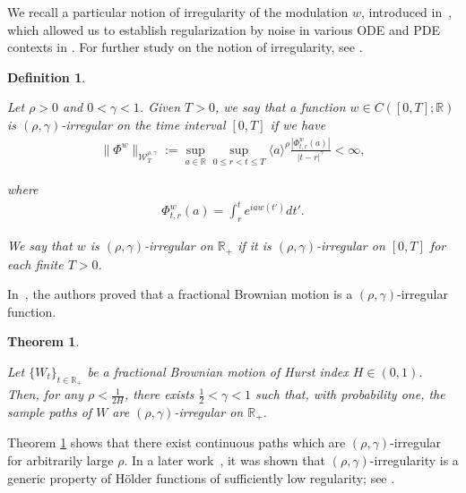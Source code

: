 \documentclass[letterpaper, 11pt,  reqno]{amsart}
\newtheorem{definition}[theorem]{Definition}
\newtheorem{oldtheorem}{Theorem}
\newcommand{\1}{\hspace{0.5mm}\text{I}\hspace{0.5mm}}
\newcommand{\noi}{\noindent}
\newcommand{\R}{\mathbb{R}}
\newcommand{\g}{\gamma}
\newcommand{\W}{\mathcal{W}}
\numberwithin{equation}{section}
\numberwithin{theorem}{section}
\begin{document}
We recall a particular notion of irregularity of the modulation $w$, 
introduced in~\cite{CatellierGubinelli, CG1},
which allowed us 
 to establish regularization by noise  in various  ODE and PDE contexts
in \cite{CatellierGubinelli,CG1, CGLLO1, CGLLO2}.
For further study on the notion of irregularity, 
see  \cite{GG, RT}.



\begin{definition}
\label{DEF:ir}
\rm

Let $\rho>0$ and  $0 < \g < 1$.
Given $T > 0$, we say that a function $w\in C([0,T];\R)$ is $(\rho,\g)$-irregular 
on the time interval $[0, T]$  if we have
\begin{align}
\|\Phi^w\|_{  \W^{\rho,\g}_T} 
:= \sup_{a\in \R} \sup_{0\leq r < t\leq T} \langle a \rangle^\rho \frac{|\Phi^w_{t,r}(a)|}{|t-r|^\g} 
< \infty, 
\label{rho1}
\end{align}


\noi
where 
\begin{align}
\Phi^w_{t,r}(a)
=\int_r^t e^{i  a w(t') } d t'.
\label{rho2}
\end{align}


\noi
We say that $w$ is 
$(\rho,\g)$-irregular 
on $\R_+$  if it is 
$(\rho,\g)$-irregular 
on $[0, T]$ for each finite $T > 0$.


\end{definition}









In~\cite{CatellierGubinelli}, 
the authors proved that a fractional Brownian motion is a $(\rho,\g)$-irregular function.
 
 
\begin{oldtheorem}
\label{THM:A}

Let $\{W_t\}_{t\in \R_+}$ be a fractional Brownian motion 
of Hurst index $H\in(0,1)$.
Then, 
for any $\rho < \frac{1}{2H}$,  
there exists $\frac 12 < \g < 1$
such that,  with probability one,  the sample paths of 
$W$ are $(\rho,\g)$-irregular on $\R_+$.

\end{oldtheorem}

Theorem \ref{THM:A}
shows that there exist continuous paths which are $(\rho, \g)$-irregular for arbitrarily large $\rho$. 
In a later work~\cite{GG}, it was shown  that $(\rho,\g)$-irregularity is a generic property of H\"older functions of sufficiently low regularity; see \cite[p.\,2418 and Theorem 3.1]{GG}.
\end{document}
